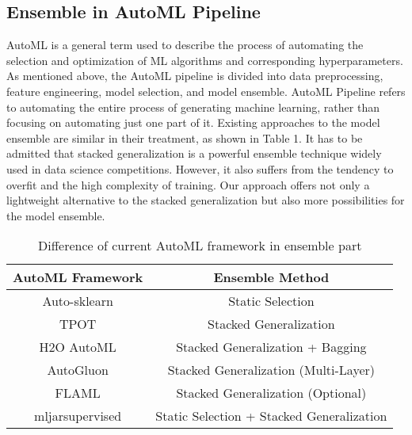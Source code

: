 \documentclass[review]{elsarticle}
\begin{document}
\subsection{Ensemble in AutoML Pipeline}
AutoML is a general term used to describe the process of automating the selection and optimization of ML algorithms and corresponding hyperparameters. As mentioned above, the AutoML pipeline is divided into data preprocessing, feature engineering, model selection, and model ensemble. AutoML Pipeline refers to automating the entire process of generating machine learning, rather than focusing on automating just one part of it. Existing approaches to the model ensemble are similar in their treatment, as shown in Table 1. It has to be admitted that stacked generalization is a powerful ensemble technique widely used in data science competitions. However, it also suffers from the tendency to overfit and the high complexity of training. Our approach offers not only a lightweight alternative to the stacked generalization but also more possibilities for the model ensemble.
\begin{table}[htbp]
	\centering
	\caption{Difference of current AutoML framework in ensemble part}
	\begin{tabular}{c c}
		\toprule
		AutoML Framework & Ensemble Method\\
		\midrule
		Auto-sklearn & Static Selection \\
		TPOT & Stacked Generalization \\
		H2O AutoML\cite{ledell2020h2o} & Stacked Generalization + Bagging \\
		AutoGluon & Stacked Generalization (Multi-Layer) \\
		FLAML & Stacked Generalization (Optional) \\
		mljarsupervised & Static Selection + Stacked Generalization\\
		\bottomrule
	\end{tabular}
\end{table}
\end{document}
